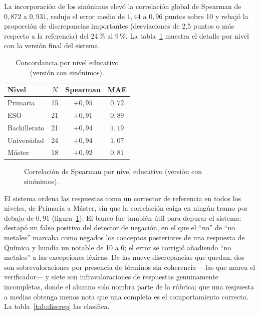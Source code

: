 La incorporación de los sinónimos elevó la correlación global de Spearman de $0{,}872$ a $0{,}931$, redujo el error medio de $1{,}44$ a $0{,}96$ puntos sobre 10 y rebajó la proporción de discrepancias importantes (desviaciones de 2{,}5 puntos o más respecto a la referencia) del 24\,\% al 9\,\%. La tabla~\ref{tab:niveles} muestra el detalle por nivel con la versión final del sistema.

\begin{table}[ht]
\centering
\caption{Concordancia por nivel educativo (versión con sinónimos).}
\label{tab:niveles}
\small
\begin{tabular}{lccc}
\toprule
Nivel & $N$ & Spearman & MAE \\
\midrule
Primaria & 15 & $+0{,}95$ & $0{,}72$ \\
ESO & 21 & $+0{,}91$ & $0{,}89$ \\
Bachillerato & 21 & $+0{,}94$ & $1{,}19$ \\
Universidad & 24 & $+0{,}94$ & $1{,}07$ \\
Máster & 18 & $+0{,}92$ & $0{,}81$ \\
\bottomrule
\end{tabular}
\end{table}

\begin{figure}[ht]
\centering
{}
\caption{Correlación de Spearman por nivel educativo (versión con sinónimos).}
\label{fig:spearman-nivel}
\end{figure}

El sistema ordena las respuestas como un corrector de referencia en todos los niveles, de Primaria a Máster, sin que la correlación caiga en ningún tramo por debajo de $0{,}91$ (figura~\ref{fig:spearman-nivel}). El banco fue también útil para depurar el sistema: destapó un falso positivo del detector de negación, en el que el ``no'' de ``no metales'' marcaba como negados los conceptos posteriores de una respuesta de Química y hundía un notable de 10 a 6; el error se corrigió añadiendo ``no metales'' a las excepciones léxicas. De las nueve discrepancias que quedan, dos son sobrevaloraciones por presencia de términos sin coherencia —las que marca el verificador— y siete son infravaloraciones de respuestas genuinamente incompletas, donde el alumno solo nombra parte de la rúbrica; que una respuesta a medias obtenga menos nota que una completa es el comportamiento correcto. La tabla~\ref{tab:discrep} las clasifica.

